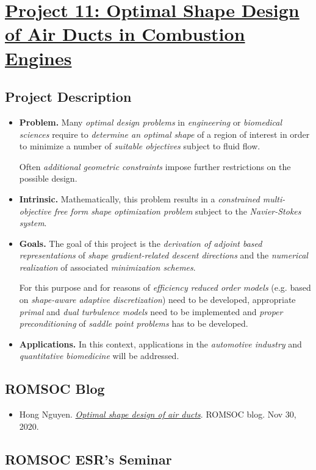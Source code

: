 \documentclass{book}
\numberwithin{equation}{section}
\begin{document}
\chapter{\href{https://www.romsoc.eu/optimal-shape-design-of-air-ducts-in-combustion-engines/}{Project 11: Optimal Shape Design of Air Ducts in Combustion Engines}}

\section{Project Description}
\begin{itemize}
    \item \textbf{Problem.} Many \textit{optimal design problems} in \textit{engineering} or \textit{biomedical sciences} require to \textit{determine an optimal shape} of a region of interest in order to minimize a number of \textit{suitable objectives} subject to fluid flow.
    
    Often \textit{additional geometric constraints} impose further restrictions on the possible design.
    \item \textbf{Intrinsic.} Mathematically, this problem results in a \textit{constrained multi-objective free form shape optimization problem} subject to the \textit{Navier-Stokes system}.
    \item \textbf{Goals.} The goal of this project is the \textit{derivation of adjoint based representations} of \textit{shape  gradient-related descent directions} and the \textit{numerical realization} of associated \textit{minimization schemes}.
    
    For this purpose and for reasons of \textit{efficiency reduced order models} (e.g. based on \textit{shape-aware adaptive discretization}) need to be developed, appropriate \textit{primal} and \textit{dual turbulence models} need to be implemented and \textit{proper preconditioning} of \textit{saddle point problems} has to be developed.
    \item \textbf{Applications.} In this context, applications in the \textit{automotive industry} and \textit{quantitative biomedicine} will be addressed.
\end{itemize}

\section{ROMSOC Blog}
\begin{itemize}
    \item Hong Nguyen. \href{https://www.romsoc.eu/optimal-shape-design-of-air-ducts/}{\textit{Optimal shape design of air ducts}}. ROMSOC blog. Nov 30, 2020.
\end{itemize}

\section{ROMSOC ESR's Seminar}


\printbibliography[heading=bibintoc]
\end{document}

